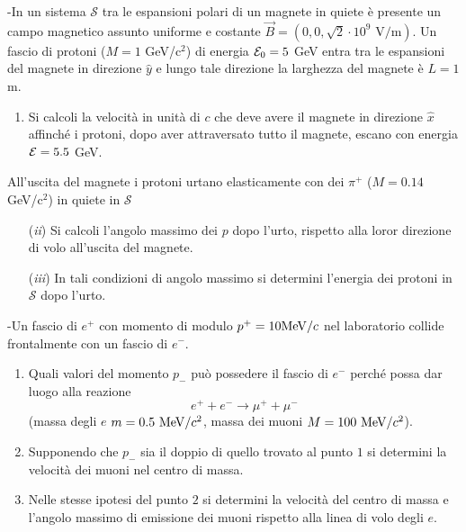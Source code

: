 \documentclass[12pt,twoside,a4]{article}
\begin{document}
\newpage
\begin{esercizio}[Esame 19/09/2015]
	-In un sistema $\mathcal{S}$ tra le espansioni polari di un magnete in quiete è presente un campo magnetico assunto uniforme e costante $\vec{B} = (0,0,\sqrt{2} \cdot 10^9 \mbox{ V/m})$. Un fascio di protoni ($M = 1 $ GeV/c$^2$) di energia $\mathcal{E}_0 = 5$ GeV entra tra le espansioni del magnete in direzione $\widehat{y}$ e lungo tale direzione la larghezza del magnete è $L = 1$ m. 
\begin{enumerate}[label=(\textit{\roman*})]
\item Si calcoli la velocità  in unità  di $c$ che deve avere il magnete in direzione $\widehat{x}$ affinché i protoni, dopo aver attraversato tutto il magnete, escano con energia $\mathcal{E} = 5.5$ GeV.
\end{enumerate}
\begin{flushleft} All'uscita del magnete i protoni urtano elasticamente con dei $\pi^+$ ($M = 0.14 $ GeV/c$^2$) in quiete in $\mathcal{S}$
\end{flushleft}
\begin{enumerate}[label=(\textit{\roman*})]
\item[(\textit{ii})] Si calcoli l'angolo massimo dei $p$ dopo l'urto, rispetto alla loror direzione di volo all'uscita del magnete.
\item[(\textit{iii})] In tali condizioni di angolo massimo si determini l'energia dei protoni in $\mathcal{S}$ dopo l'urto.
\end{enumerate}
\end{esercizio}


\begin{esercizio}[Esame 04/02/2014]
	-Un fascio di $e^+$ con momento di modulo $p^+ = 10 \mathrm{MeV}/c$ nel laboratorio collide frontalmente con un fascio di $e^-$.  
\begin{enumerate}[label=(\textit{\roman*})]
\item Quali valori del momento $p_-$ può possedere il fascio di $e^-$ perché possa dar luogo alla reazione 
$$ e^+ + e^- \longrightarrow \mu^+ + \mu^- $$
(massa degli $e$ $m=0.5 \ \mathrm{MeV}/c^2$, massa dei muoni $M=100 \ \mathrm{MeV}/c^2$).
\item Supponendo che $p_-$ sia il doppio di quello trovato al punto $1$ si determini la velocità  dei muoni nel centro di massa.
\item Nelle stesse ipotesi del punto $2$ si determini la velocità  del centro di massa e l'angolo massimo di emissione dei muoni rispetto alla linea di volo degli $e$.
\end{enumerate}
\end{esercizio}
\end{document}
